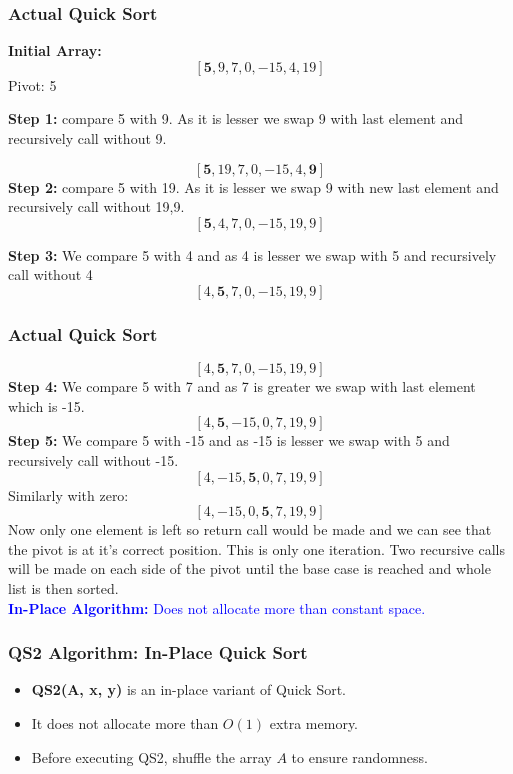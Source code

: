 \begin{frame}
    \frametitle{Actual Quick Sort}
    
    \textbf{Initial Array:}
    \[
    [\mathbf{5}, 9, 7, 0, -15, 4, 19]
    \]
    Pivot: 5
    
    
    \vspace{0.3cm}
    \textbf{Step 1:} compare 5 with 9. As it is lesser we swap 9 with last element and recursively call without 9.
    
    \[
    [\mathbf{5}, 19, 7, 0, -15, 4, \mathbf{9}]
    \]
     \textbf{Step 2:} compare 5 with 19. As it is lesser we swap 9 with new last element and recursively call without 19,9.
    \[
    [\mathbf{5}, 4, 7, 0, -15, 19, 9]
    \]
 
    \textbf{Step 3:} We compare 5 with 4 and as 4 is lesser we swap with 5 and recursively call without 4
    \[
    [4, \mathbf{5}, 7, 0, -15, 19, 9]
    \]

\end{frame}



\begin{frame}
    \frametitle{Actual Quick Sort}
     \[
    [4, \mathbf{5}, 7, 0, -15, 19, 9]
    \]
    \textbf{Step 4:} We compare 5 with 7 and as 7 is greater we swap with last element which is -15.
    \[
    [4, \mathbf{5}, -15, 0, 7, 19, 9]
    \]
     \textbf{Step 5:} We compare 5 with -15 and as -15 is lesser we swap with 5 and recursively call without -15.
      \[
    [4, -15, \mathbf{5}, 0, 7, 19, 9]
    \]
    Similarly with zero: \\
     \[
    [4, -15, 0, \mathbf{5}, 7, 19, 9]
    \]
    Now only one element is left so return call would be made and we can see that the pivot is at it's correct position. This is only one iteration. Two recursive calls will be made on each side of the pivot until the base case is reached and whole list is then sorted.\\
       \vspace{0.3cm}
    \textcolor{blue}{\textbf{In-Place Algorithm:} Does not allocate more than constant space.}

\end{frame}

\begin{frame}
    \frametitle{QS2 Algorithm: In-Place Quick Sort}
    \begin{itemize}
        \item \textbf{QS2(A, x, y)} is an in-place variant of Quick Sort.
        \item It does not allocate more than \( O(1) \) extra memory.
        \item  Before executing QS2, shuffle the array \( A \) to ensure randomness.
    \end{itemize}
\end{frame}



